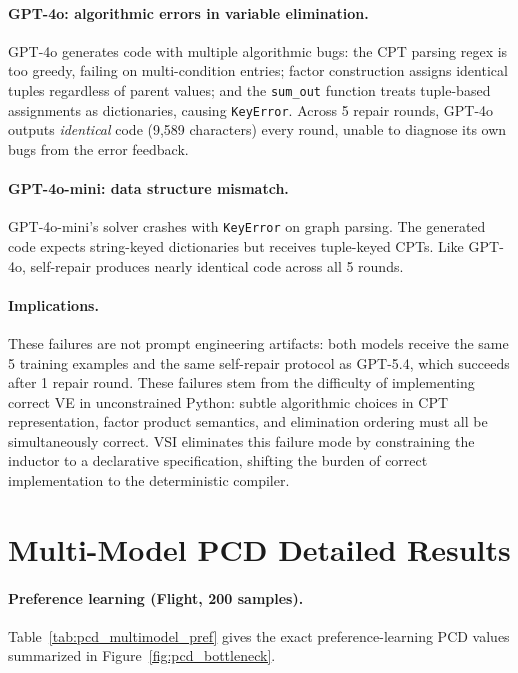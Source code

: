 \documentclass{article}
\begin{document}
\paragraph{GPT-4o: algorithmic errors in variable elimination.}
GPT-4o generates code with multiple algorithmic bugs: the CPT parsing regex is too greedy, failing on multi-condition entries; factor construction assigns identical tuples regardless of parent values; and the \texttt{sum\_out} function treats tuple-based assignments as dictionaries, causing \texttt{KeyError}.
Across 5 repair rounds, GPT-4o outputs \emph{identical} code (9,589 characters) every round, unable to diagnose its own bugs from the error feedback.

\paragraph{GPT-4o-mini: data structure mismatch.}
GPT-4o-mini's solver crashes with \texttt{KeyError} on graph parsing.
The generated code expects string-keyed dictionaries but receives tuple-keyed CPTs.
Like GPT-4o, self-repair produces nearly identical code across all 5 rounds.

\paragraph{Implications.}
These failures are not prompt engineering artifacts: both models receive the same 5 training examples and the same self-repair protocol as GPT-5.4, which succeeds after 1 repair round.
These failures stem from the difficulty of implementing correct VE in unconstrained Python: subtle algorithmic choices in CPT representation, factor product semantics, and elimination ordering must all be simultaneously correct.
VSI eliminates this failure mode by constraining the inductor to a declarative specification, shifting the burden of correct implementation to the deterministic compiler.

\section{Multi-Model PCD Detailed Results}
\label{app:pcd_multimodel}

\paragraph{Preference learning (Flight, 200 samples).}
Table~\ref{tab:pcd_multimodel_pref} gives the exact preference-learning PCD values summarized in Figure~\ref{fig:pcd_bottleneck}.
\end{document}
